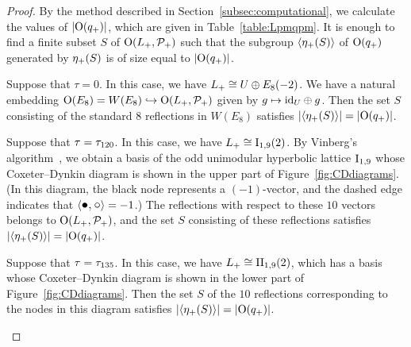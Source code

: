 \documentclass{amsart} %
\begin{document}
\begin{proof}
By the method described in Section~\ref{subsec:computational},
we calculate the values of $|\mathord{\mathrm{O}}(q_{+})|$, 
which are given in Table~\ref{table:Lpmqpm}.
It is enough to find a finite subset $S$ 
of $\mathord{\mathrm{O}}(L_{+}, \mathord{\mathcal{P}}_{+})$ such that 
the subgroup $\langle {{\eta}_{+}(S)} \rangle$ of $\mathord{\mathrm{O}}(q_{+})$
generated by ${\eta}_{+}(S)$ is of size equal to $|\mathord{\mathrm{O}}(q_{+})|$.
\par
Suppose that $\tau=0$.
In this case,
we have $L_{+}\cong U\oplus E_8(-2)$.
We have a natural embedding $\mathord{\mathrm{O}}(E_8)=W(E_8)\hookrightarrow \mathord{\mathrm{O}}(L_{+}, \mathord{\mathcal{P}}_{+})$
given by $g\mapsto \mathord{\mathrm{id}}_U \oplus g$.
Then %
the set $S$ consisting of the standard $8$ reflections in $W(E_8)$ 
satisfies $|\langle {{\eta}_{+}(S)} \rangle|=|\mathord{\mathrm{O}}(q_{+})|$.
%
\par
Suppose that $\tau= \tau_{120}$.
In this case,
we have $L_{+}\cong \mathrm{I}_{1, 9}(2)$.
By Vinberg’s algorithm~\cite{Vinberg1985}, 
we obtain a basis of the odd unimodular hyperbolic lattice $\mathrm{I}_{1,9}$ 
whose Coxeter–Dynkin diagram is shown in the upper part of Figure~\ref{fig:CDdiagrams}. 
(In this diagram, 
the black node represents a $(-1)$-vector, and 
the dashed edge indicates that 
$\langle \hbox{\large{$\bullet, \circ$}} \rangle=-1$.)
The reflections 
with respect to these $10$ vectors
belongs to $\mathord{\mathrm{O}}(L_{+}, \mathord{\mathcal{P}}_{+})$, and 
 the set $S$ consisting of these  reflections
satisfies $|\langle {{\eta}_{+}(S)} \rangle|=|\mathord{\mathrm{O}}(q_{+})|$.
%
\par
Suppose that $\tau= \tau_{135}$.
In this case,
we have $L_{+}\cong \mathrm{II}_{1, 9}(2)$,
which 
has a basis 
whose Coxeter–Dynkin diagram is shown in the lower part of Figure~\ref{fig:CDdiagrams}. 
Then the set $S$ of the
 $10$ reflections corresponding to the nodes in this diagram
satisfies $|\langle {{\eta}_{+}(S)} \rangle|=|\mathord{\mathrm{O}}(q_{+})|$.
%
\begin{figure}%


\end{figure}
\end{proof}
\end{document}
